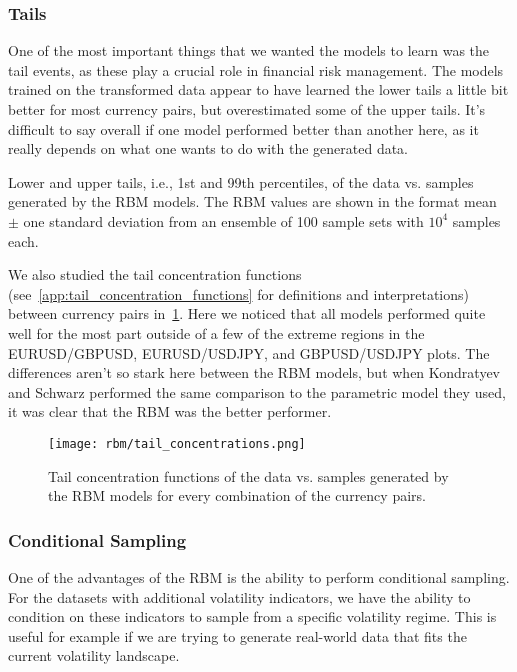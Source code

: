 \subsubsection{Tails}
One of the most important things that we wanted the models to learn was the tail events, as these play a crucial role in financial risk management.
The models trained on the transformed data appear to have learned the lower tails a little bit better for most currency pairs, but overestimated some of the upper tails.
It's difficult to say overall if one model performed better than another here, as it really depends on what one wants to do with the generated data.
\begin{table}[!htb]
    \centering
    \begin{adjustbox}{max width=\textwidth}
        
    \end{adjustbox}
    \caption{Lower and upper tails, i.e., 1st and 99th percentiles, of the data vs. samples generated by the RBM models. The RBM values are shown in the format mean \(\pm\) one standard deviation from an ensemble of 100 sample sets with \( 10^4 \) samples each.}
    \label{tbl:rbm_tails}
\end{table}

We also studied the tail concentration functions (see~\cref{app:tail_concentration_functions} for definitions and interpretations) between currency pairs in~\cref{fig:rbm_tail_concentrations}.
Here we noticed that all models performed quite well for the most part outside of a few of the extreme regions in the EURUSD/GBPUSD, EURUSD/USDJPY, and GBPUSD/USDJPY plots.
The differences aren't so stark here between the RBM models, but when Kondratyev and Schwarz performed the same comparison to the parametric model they used, it was clear that the RBM was the better performer.
\begin{figure}[!htb]
    \begin{center}
        \texttt{[image: rbm/tail\_concentrations.png]}
    \end{center}
    \caption{Tail concentration functions of the data vs. samples generated by the RBM models for every combination of the currency pairs.}
    \label{fig:rbm_tail_concentrations}
\end{figure}

\subsubsection{Conditional Sampling}
One of the advantages of the RBM is the ability to perform conditional sampling.
For the datasets with additional volatility indicators, we have the ability to condition on these indicators to sample from a specific volatility regime.
This is useful for example if we are trying to generate real-world data that fits the current volatility landscape.

